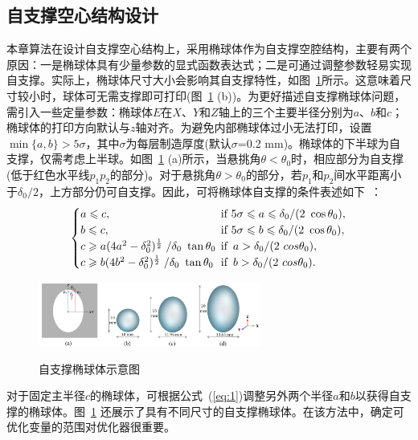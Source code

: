 \subsection{自支撑空心结构设计}
本章算法在设计自支撑空心结构上，采用椭球体作为自支撑空腔结构，主要有两个原因：一是椭球体具有少量参数的显式函数表达式；二是可通过调整参数轻易实现自支撑。实际上，椭球体尺寸大小会影响其自支撑特性，如图~\ref{fig:2}所示。这意味着尺寸较小时，球体可无需支撑即可打印(图~\ref{fig:2} (b))。为更好描述自支撑椭球体问题，需引入一些定量参数：椭球体$E$在$X$、$Y$和$Z$轴上的三个主要半径分别为$a$、$b$和$c$；椭球体的打印方向默认与$z$轴对齐。为避免内部椭球体过小无法打印，设置$\min\{a, b\}> 5\sigma$，其中$\sigma$为每层制造厚度(默认$\sigma$=0.2 mm)。椭球体的下半球为自支撑，仅需考虑上半球。如图~\ref{fig:2} (a)所示，当悬挑角$\theta < \theta_{0}$时，相应部分为自支撑(低于红色水平线$p_1p_2$的部分)。对于悬挑角$\theta > \theta_{0}$的部分，若$p_1$和$p_2$间水平距离小于$\delta_{0}/2$，上方部分仍可自支撑。因此，可将椭球体自支撑的条件表述如下~\cite{lee2018support}：
\begin{equation}
  \begin{cases}
          a\leq c , \qquad &\text{if} \,\,  5\sigma \leq a \leq \delta_{0} / (2\ \cos\theta_{0}),                                       \\
          b\leq c , \qquad &\text{if} \,\,  5\sigma \leq b \leq \delta_{0} / (2\ \cos\theta_{0}),                                       \\
          c\geq a(4a^2-\delta^2_{0})^{\frac{1}{2}} \left. \middle/ \delta_{0}\ \tan\theta_{0} \right. \ \quad &\text{if} \, \, \, a > \delta_{0} / (2\ cos\theta_{0}),   \\
          c\geq b(4b^2-\delta^2_{0})^{\frac{1}{2}} \left. \middle/ \delta_{0}\ \tan\theta_{0} \right. \ \quad &\text{if} \, \, \, b > \delta_{0} / (2\ cos\theta_{0}). 
          \label{eq:1}
  \end{cases}
\end{equation}
\begin{figure}[htbp]
  \centering
  \includegraphics[trim={0 40 0 0},clip,width=0.65\textwidth]{./figures/self-support/fig3.png}\\
  \caption{自支撑椭球体示意图}
  \label{fig:2}
\end{figure}
对于固定主半径$c$的椭球体，可根据公式~(\ref{eq:1})调整另外两个半径$a$和$b$以获得自支撑的椭球体。图~\ref{fig:2} 还展示了具有不同尺寸的自支撑椭球体。在该方法中，确定可优化变量的范围对优化器很重要。

